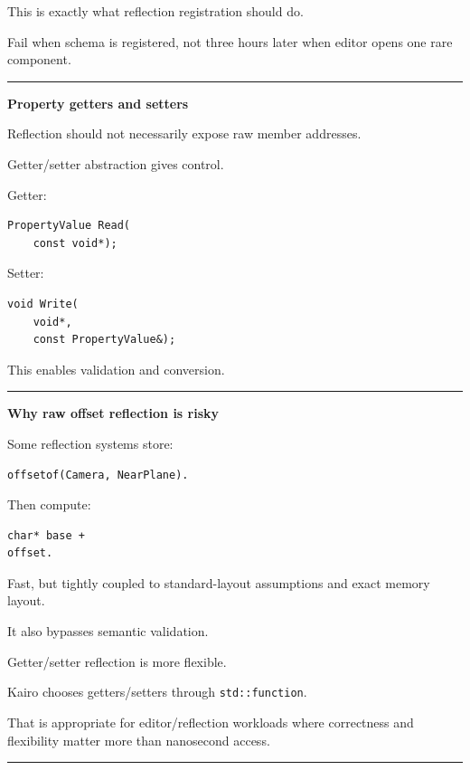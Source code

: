 This is exactly what reflection registration should do.

Fail when schema is registered, not three hours later when editor opens one rare component.

\begin{center}\rule{0.5\linewidth}{0.5pt}\end{center}

\textbf{Property getters and setters}

Reflection should not necessarily expose raw member addresses.

Getter/setter abstraction gives control.

Getter:

\begin{verbatim}
PropertyValue Read(
    const void*);
\end{verbatim}

Setter:

\begin{verbatim}
void Write(
    void*,
    const PropertyValue&);
\end{verbatim}

This enables validation and conversion.

\begin{center}\rule{0.5\linewidth}{0.5pt}\end{center}

\textbf{Why raw offset reflection is risky}

Some reflection systems store:

\begin{verbatim}
offsetof(Camera, NearPlane).
\end{verbatim}

Then compute:

\begin{verbatim}
char* base +
offset.
\end{verbatim}

Fast, but tightly coupled to standard-layout assumptions and exact memory layout.

It also bypasses semantic validation.

Getter/setter reflection is more flexible.

Kairo chooses getters/setters through \texttt{std::function}.

That is appropriate for editor/reflection workloads where correctness and flexibility matter more than nanosecond access.

\begin{center}\rule{0.5\linewidth}{0.5pt}\end{center}

